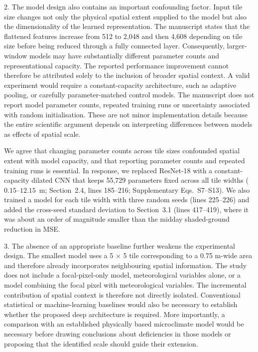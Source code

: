 \documentclass[12pt,english]{reviewresponse}
\begin{document}
\begin{revcomment}
2. The model design also contains an important confounding factor. Input tile size changes not only the physical spatial extent supplied to the model but also the dimensionality of the learned representation. The manuscript states that the flattened features increase from 512 to 2,048 and then 4,608 depending on tile size before being reduced through a fully connected layer. Consequently, larger-window models may have substantially different parameter counts and representational capacity. The reported performance improvement cannot therefore be attributed solely to the inclusion of broader spatial context. A valid experiment would require a constant-capacity architecture, such as adaptive pooling, or carefully parameter-matched control models. The manuscript does not report model parameter counts, repeated training runs or uncertainty associated with random initialisation. These are not minor implementation details because the entire scientific argument depends on interpreting differences between models as effects of spatial scale.
\end{revcomment}

\begin{revresponse}
We agree that changing parameter counts across tile sizes confounded spatial extent with model capacity, and that reporting parameter counts and repeated training runs is essential. In response, we replaced ResNet-18 with a constant-capacity dilated CNN that keeps 55,729 parameters fixed across all tile widths ($0.15\text{--}12.15$~m; Section~2.4, lines 185--216; Supplementary Eqs.~S7--S13). We also trained a model for each tile width with three random seeds (lines 225--226) and added the cross-seed standard deviation to Section~3.1 (lines 417--419), where it was about an order of magnitude smaller than the midday shaded-ground reduction in MSE.
\end{revresponse}

\begin{revcomment}
3. The absence of an appropriate baseline further weakens the experimental design. The smallest model uses a 5 × 5 tile corresponding to a 0.75 m-wide area and therefore already incorporates neighbouring spatial information. The study does not include a focal-pixel-only model, meteorological variables alone, or a model combining the focal pixel with meteorological variables. The incremental contribution of spatial context is therefore not directly isolated. Conventional statistical or machine-learning baselines would also be necessary to establish whether the proposed deep architecture is required. More importantly, a comparison with an established physically based microclimate model would be necessary before drawing conclusions about deficiencies in those models or proposing that the identified scale should guide their extension.
\end{revcomment}
\end{document}
